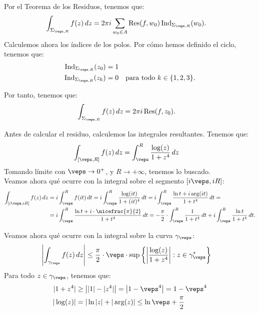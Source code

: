 \begin{ejercicio}
    Por el Teorema de los Residuos, tenemos que:
    \begin{align*}
        \int_{\Sigma_{\veps, R}} f(z) \, dz &= 2\pi i\sum_{w_0\in A}\Res(f,w_0)\Ind_{\Sigma_{\veps, R}}(w_0).
    \end{align*}
    Calculemos ahora los índices de los polos. Por cómo hemos definido el ciclo, tenemos que:
    \begin{align*}
        \Ind_{\Sigma_{\veps, R}}(z_0) &= 1\\
        \Ind_{\Sigma_{\veps, R}}(z_k) &= 0 \quad \text{para todo } k\in \{1, 2, 3\}.
    \end{align*}

    Por tanto, tenemos que:
    \begin{align*}
        \int_{\Sigma_{\veps, R}} f(z) \, dz &= 2\pi i\Res(f, z_0).
    \end{align*}

    Antes de calcular el residuo, calculemos las integrales resultantes. Tenemos que:
    \begin{align*}
        \int_{[\veps, R]} f(z) \, dz &= \int_{\veps}^{R} \frac{\log(z)}{1 + z^4} \, dz
    \end{align*}
    Tomando límite con $\veps\to 0^+$, y $R\to +\infty$, tenemos lo buscado.\\

    Veamos ahora qué ocurre con la integral sobre el segmento $[i\veps, iR]$:
    \begin{align*}
        \int_{[i\veps, iR]} f(z) \, dz &= i\int_{\veps}^{R} f(it) \, dt
        = i\int_{\veps}^{R} \frac{\log(it)}{1 + (it)^4} \, dt
        = i\int_{\veps}^{R} \frac{\ln t + i\arg(it)}{1 + t^4} \, dt
        =\\&= i\int_{\veps}^{R} \frac{\ln t + i\cdot \nicefrac{\pi}{2}}{1 + t^4} \, dt
        = -\frac{\pi}{2}\cdot \int_{\veps}^{R} \frac{1}{1 + t^4} \, dt + i\int_{\veps}^{R} \frac{\ln t}{1 + t^4} \, dt.
    \end{align*}

    Veamos ahora qué ocurre con la integral sobre la curva $\gamma_{\veps}$:
    \begin{align*}
        \left|\int_{\gamma_{\veps}} f(z) \, dz\right| &\leq \frac{\pi}{2}\cdot \veps \cdot \sup\left\{\left|\dfrac{\log(z)}{1 + z^4}\right| : z\in \gamma_{\veps}^*\right\}
    \end{align*}
    Para todo $z\in \gamma_{\veps}$, tenemos que:
    \begin{align*}
        |1+z^4| &\geq \left||1| - |z^4|\right| = \left|1 - \veps^4\right| = 1 - \veps^4\\
        |\log(z)| &= |\ln|z| + |\arg(z)|\leq \ln\veps + \frac{\pi}{2}
    \end{align*}


\end{ejercicio}
